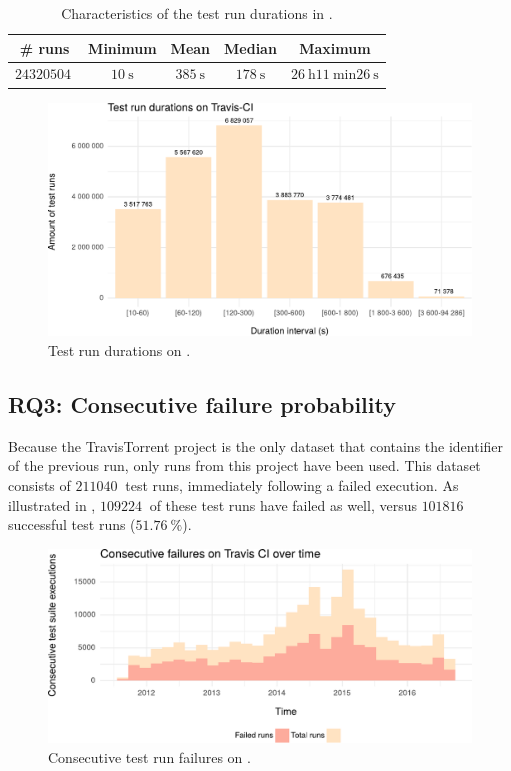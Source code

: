 \begin{table}[h]
	\centering
	\begin{tabularx}{\textwidth}{|C|C|C|C|C|}
		\hline
		\textbf{\# runs} & \textbf{Minimum} & \textbf{Mean} & \textbf{Median} & \textbf{Maximum}\\
		\hline
		$\SI{24320504}{}$ & $\SI{10}{\second}$ & $\SI{385}{\second}$ & $\SI{178}{\second}$ & $\SI{26}{\hour} \SI{11}{\minute} \SI{26}{\second}$\\
		\hline
	\end{tabularx}
	\caption{Characteristics of the test run durations in \cite{travisanalysis}.}
	\label{tbl:rq2-characteristics}
\end{table}

\begin{figure}[htbp!]
	\centering
	\includegraphics[width=\textwidth]{assets/charts/rq2-test-run-durations.pdf}
	\caption{Test run durations on \travisci{}.}
	\label{fig:rq2-durations}
\end{figure}


\subsection{RQ3: Consecutive failure probability}
Because the TravisTorrent project is the only dataset that contains the identifier of the previous run, only runs from this project have been used. This dataset consists of $\SI{211040}{}$ test runs, immediately following a failed execution. As illustrated in , $\SI{109224}{}$ of these test runs have failed as well, versus $\SI{101816}{}$ successful test runs ($\SI{51.76}{\percent}$).

\begin{figure}[htbp!]
	\centering
	\includegraphics[width=\textwidth]{assets/charts/rq3-consecutive-failure.pdf}
	\caption{Consecutive test run failures on \travisci{}.}
	\label{fig:rq3-consecutive-failure}
\end{figure}

